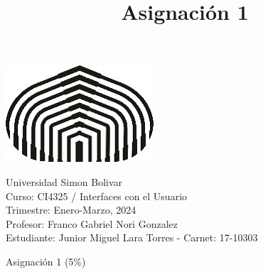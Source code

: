 \documentclass[a4paper,12pt]{article}
\title{Asignación 1}
\begin{document}
\begin{center}
\par \includegraphics[scale=1]{USB} \par
Universidad Simon Bolivar \\ Curso: CI4325 / Interfaces con el Usuario \\ Trimestre: Enero-Marzo, 2024 \\ Profesor: Franco Gabriel Nori Gonzalez \\ Estudiante: Junior Miguel Lara Torres - Carnet: 17-10303 \\
\end{center}

\begin{center}
Asignación 1 (5\%)
\end{center}
\end{document}
